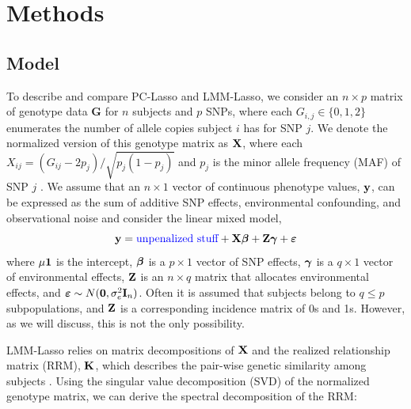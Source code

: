 \section{Methods} \label{sec:methods}



\subsection{Model}


To describe and compare PC-Lasso and LMM-Lasso, we consider an $n \times p$ matrix of genotype data $\boldsymbol{G}$ for $n$ subjects and $p$ SNPs, where each $G_{i,j} \in \{ 0, 1, 2 \}$ enumerates the number of allele copies subject $i$ has for SNP $j$. We denote the normalized version of this genotype matrix as $\textbf{X}$, where each $X_{ij} = (G_{ij} - 2 p_j) / \sqrt{p_j (1 - p_j)}$ and $p_j$ is the minor allele frequency (MAF) of SNP $j$ \citep{zhang2015principal, price2006principal}. We assume that an $n \times 1$ vector of continuous phenotype values, $\textbf{y}$, can be expressed as the sum of additive SNP effects, environmental confounding, and observational noise and consider the linear mixed model,
\begin{equation}
    \label{eqn:model}
    \textbf{y} = \text{\textcolor{blue}{unpenalized stuff}} + \textbf{X}\boldsymbol{\beta} + \textbf{Z}\boldsymbol{\gamma} + \boldsymbol{\varepsilon}
\end{equation}
where $\mu \textbf{1}$ is the intercept, $\boldsymbol{\beta}$ is a $p \times 1$ vector of SNP effects, $\boldsymbol{\gamma}$ is a $q \times 1$ vector of environmental effects, $\textbf{Z}$ is an $n \times q$ matrix that allocates environmental effects, and $\boldsymbol{\varepsilon} \sim N(\boldsymbol{0}, \sigma^2_e \textbf{I}_n)$. Often it is assumed that subjects belong to $q \le p$ subpopulations, and $\textbf{Z}$ is a corresponding incidence matrix of 0s and 1s. However, as we will discuss, this is not the only possibility.

LMM-Lasso relies on matrix decompositions of $\textbf{X}$ and the realized relationship matrix (RRM), $\textbf{K}$, which describes the pair-wise genetic similarity among subjects \citep{hayes2009increased}. Using the singular value decomposition (SVD) of the normalized genotype matrix, we can derive the spectral decomposition of the RRM: 

